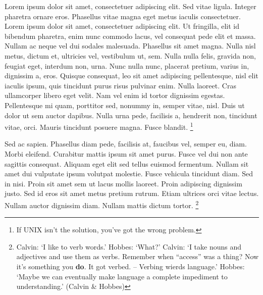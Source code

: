 \documentclass[nochapterpage,bigchapter,linedtoc,longdoc,colorback,accentcolor=tud4c]{tudreport}
\begin{document}
    Lorem ipsum dolor sit amet, consectetuer adipiscing elit. Sed vitae ligula. Integer pharetra ornare eros. Phasellus vitae magna eget metus iaculis consectetuer. Lorem ipsum dolor sit amet, consectetuer adipiscing elit. Ut fringilla, elit id bibendum pharetra, enim nunc commodo lacus, vel consequat pede elit et massa. Nullam ac neque vel dui sodales malesuada. Phasellus sit amet magna. Nulla nisl metus, dictum et, ultricies vel, vestibulum ut, sem. Nulla nulla felis, gravida non, feugiat eget, interdum non, urna. Nunc nulla nunc, placerat pretium, varius in, dignissim a, eros. Quisque consequat, leo sit amet adipiscing pellentesque, nisl elit iaculis ipsum, quis tincidunt purus risus pulvinar enim. Nulla laoreet. Cras ullamcorper libero eget velit. Nam vel enim id tortor dignissim egestas. Pellentesque mi quam, porttitor sed, nonummy in, semper vitae, nisl. Duis ut dolor ut sem auctor dapibus. Nulla urna pede, facilisis a, hendrerit non, tincidunt vitae, orci. Mauris tincidunt posuere magna. Fusce blandit.%
    \footnote{If UNIX isn't the solution, you've got the wrong problem.}

    Sed ac sapien. Phasellus diam pede, facilisis at, faucibus vel, semper eu, diam. Morbi eleifend. Curabitur mattis ipsum sit amet purus. Fusce vel dui non ante sagittis consequat. Aliquam eget elit sed tellus euismod fermentum. Nullam sit amet dui vulputate ipsum volutpat molestie. Fusce vehicula tincidunt diam. Sed in nisi. Proin sit amet sem ut lacus mollis laoreet. Proin adipiscing dignissim justo. Sed id eros sit amet metus pretium rutrum. Etiam ultrices orci vitae lectus. Nullam auctor dignissim diam. Nullam mattis dictum tortor.
    \footnote{Calvin: `I like to verb words.' \quad Hobbes: `What?' \quad Calvin: `I take nouns and adjectives
    and use them as verbs. Remember when ``access'' was a thing? Now it's something you \textbf{do}.
    It got verbed. -- Verbing wierds language.' \quad Hobbes: `Maybe we can eventually make language a
    complete impediment to understanding.' (Calvin \& Hobbes)}
    
\end{document}
